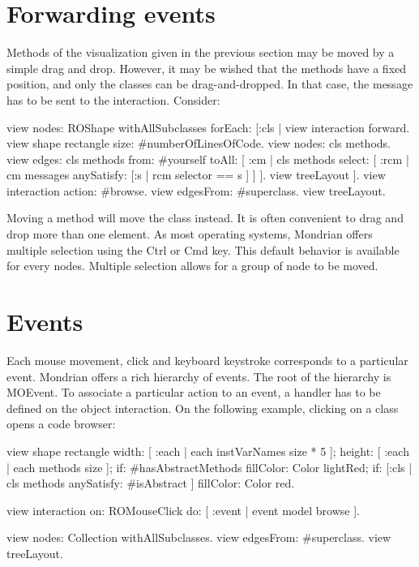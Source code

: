 \documentclass[a4paper,10pt,twoside]{book}
\begin{document}
\section{Forwarding events}

Methods of the visualization given in the previous section may be moved by a simple drag and drop. However, it may be wished that the methods have a fixed position, and only the classes can be drag-and-dropped. In that case, the message  has to be sent to the interaction. Consider:

\newpage
\begin{code}{}
view nodes: ROShape withAllSubclasses forEach: [:cls |
	view interaction forward.
	view shape rectangle 
					size: #numberOfLinesOfCode.
	view nodes: cls methods.
	view edges: cls methods from: #yourself toAll: [ :cm | cls methods select: [ :rcm |  cm messages anySatisfy: [:s | rcm selector == s ] ] ].
	view treeLayout
].
view interaction action: #browse.
view edgesFrom: #superclass.
view treeLayout.
\end{code}

Moving a method will move the class instead. It is often convenient to drag and drop more than one element. As most operating systems, Mondrian offers multiple selection using the Ctrl or Cmd key. This default behavior is available for every nodes. Multiple selection allows for a group of node to be moved.


\section{Events}

Each mouse movement, click and keyboard keystroke corresponds to a particular event. Mondrian offers a rich hierarchy of events. The root of the hierarchy is MOEvent. To associate a particular action to an event, a handler has to be defined on the object interaction. On the following example, clicking on a class opens a code browser:

\begin{code}{}
view shape rectangle
  width: [ :each | each instVarNames size * 5 ];
  height: [ :each | each methods size ];
  if: #hasAbstractMethods fillColor: Color lightRed;
  if: [:cls | cls methods anySatisfy: #isAbstract ] fillColor: Color red.
  
view interaction on: ROMouseClick do: [ :event | event model browse ].

view nodes: Collection withAllSubclasses.
view edgesFrom: #superclass.
view treeLayout.
\end{code}
\end{document}
